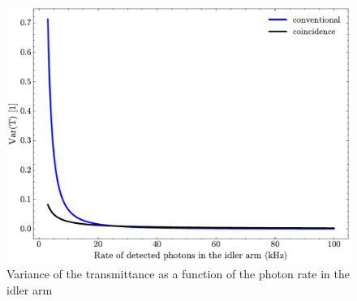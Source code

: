 \begin{figure}[tb!]
	\centering
	\includegraphics[width=.7\textwidth]{Images/SimulationSweepRateIdl.pdf}
	\caption{Variance of the transmittance as a function of the photon rate in the idler arm}
	\label{fig:SimRateIdl}
\end{figure}

